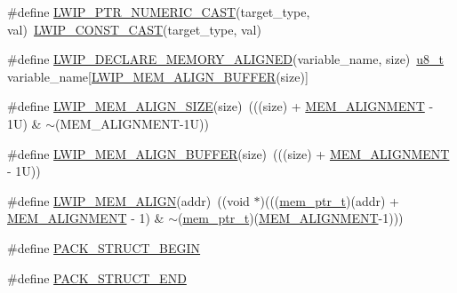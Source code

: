\begin{DoxyCompactItemize}
\item 
\#define \hyperlink{group__compiler__abstraction_ga683e5c35d3263fe3145e6a6bc546604a}{L\+W\+I\+P\+\_\+\+P\+T\+R\+\_\+\+N\+U\+M\+E\+R\+I\+C\+\_\+\+C\+A\+ST}(target\+\_\+type,  val)~\hyperlink{group__compiler__abstraction_gaa0dd3f76dd9a837feaac61fedc0dbe72}{L\+W\+I\+P\+\_\+\+C\+O\+N\+S\+T\+\_\+\+C\+A\+ST}(target\+\_\+type, val)
\item 
\#define \hyperlink{group__compiler__abstraction_ga651bb349041669fe717b19f127ef16c0}{L\+W\+I\+P\+\_\+\+D\+E\+C\+L\+A\+R\+E\+\_\+\+M\+E\+M\+O\+R\+Y\+\_\+\+A\+L\+I\+G\+N\+ED}(variable\+\_\+name,  size)~\hyperlink{group__compiler__abstraction_ga4caecabca98b43919dd11be1c0d4cd8e}{u8\+\_\+t} variable\+\_\+name\mbox{[}\hyperlink{group__compiler__abstraction_ga25591dcb72fccc7b5dc46fbc1959694e}{L\+W\+I\+P\+\_\+\+M\+E\+M\+\_\+\+A\+L\+I\+G\+N\+\_\+\+B\+U\+F\+F\+ER}(size)\mbox{]}
\item 
\#define \hyperlink{group__compiler__abstraction_gaef204be511fd32f681b55abc08e9ae18}{L\+W\+I\+P\+\_\+\+M\+E\+M\+\_\+\+A\+L\+I\+G\+N\+\_\+\+S\+I\+ZE}(size)~(((size) + \hyperlink{group__lwip__opts__mem_ga97343214666ee6dcb18c0bd77b441ea7}{M\+E\+M\+\_\+\+A\+L\+I\+G\+N\+M\+E\+NT} -\/ 1\+U) \& $\sim$(\+M\+E\+M\+\_\+\+A\+L\+I\+G\+N\+M\+E\+N\+T-\/1\+U))
\item 
\#define \hyperlink{group__compiler__abstraction_ga25591dcb72fccc7b5dc46fbc1959694e}{L\+W\+I\+P\+\_\+\+M\+E\+M\+\_\+\+A\+L\+I\+G\+N\+\_\+\+B\+U\+F\+F\+ER}(size)~(((size) + \hyperlink{group__lwip__opts__mem_ga97343214666ee6dcb18c0bd77b441ea7}{M\+E\+M\+\_\+\+A\+L\+I\+G\+N\+M\+E\+NT} -\/ 1\+U))
\item 
\#define \hyperlink{group__compiler__abstraction_gaa8e8724eb1c220cbbb90de9e175ce1dc}{L\+W\+I\+P\+\_\+\+M\+E\+M\+\_\+\+A\+L\+I\+GN}(addr)~((void $\ast$)(((\hyperlink{group__compiler__abstraction_gaf019cbb71af10dcfda7758b21e655307}{mem\+\_\+ptr\+\_\+t})(addr) + \hyperlink{group__lwip__opts__mem_ga97343214666ee6dcb18c0bd77b441ea7}{M\+E\+M\+\_\+\+A\+L\+I\+G\+N\+M\+E\+NT} -\/ 1) \& $\sim$(\hyperlink{group__compiler__abstraction_gaf019cbb71af10dcfda7758b21e655307}{mem\+\_\+ptr\+\_\+t})(\hyperlink{group__lwip__opts__mem_ga97343214666ee6dcb18c0bd77b441ea7}{M\+E\+M\+\_\+\+A\+L\+I\+G\+N\+M\+E\+NT}-\/1)))
\item 
\#define \hyperlink{group__compiler__abstraction_ga73199061891adf1b912d20835c7d5e96}{P\+A\+C\+K\+\_\+\+S\+T\+R\+U\+C\+T\+\_\+\+B\+E\+G\+IN}
\item 
\#define \hyperlink{group__compiler__abstraction_ga465fef70f294e21cbf4ea51fc342f20e}{P\+A\+C\+K\+\_\+\+S\+T\+R\+U\+C\+T\+\_\+\+E\+ND}

\end{DoxyCompactItemize}

